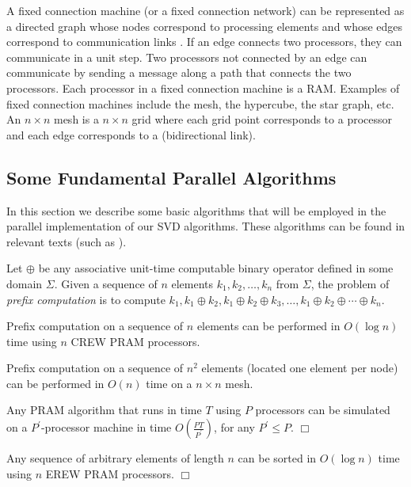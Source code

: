 A fixed connection machine (or a fixed connection network)
can be represented as a
directed graph whose nodes correspond
to processing elements and whose edges correspond to communication links \cite{Lei92,HSR08}.
If an edge connects two processors, they can  communicate in a unit
step. Two processors not connected by an edge can
communicate by sending a message along a path that connects
the two processors. Each processor in a fixed connection machine is
a RAM. 
Examples of fixed connection machines include the mesh, the
hypercube, the star graph, etc. An $n\times n$ mesh is a $n\times n$ grid where each grid point corresponds to
a processor and each edge corresponds to a (bidirectional link).

\subsection{Some Fundamental Parallel Algorithms}
In this section we  describe some basic algorithms that will be employed in
the parallel implementation of our SVD algorithms. These algorithms can be found in relevant texts 
(such as \cite{HSR08,Jaj92,Lei92}).

Let $\oplus$ be any associative unit-time computable
binary operator defined in some
domain $\Sigma$. Given a sequence of $n$ elements
$k_1,k_2,\ldots,k_n$ from $\Sigma$,
the problem of {\em prefix computation} is to compute
$k_1,k_1\oplus k_2,k_1\oplus k_2\oplus k_3,\ldots,k_1\oplus k_2\oplus\cdots \oplus k_n$.

\begin{lemma}
\label{prefix1}
Prefix computation on a sequence of $n$ elements can be performed in
$O(\log n)$ time using $n$ CREW PRAM processors.
\end{lemma}

\begin{lemma}
\label{prefix2}
Prefix computation on a sequence of $n^2$ elements (located one element per node) can be performed in
$O(n)$ time on a $n\times n$ mesh. 
\end{lemma}

\begin{lemma}
\label{slowdown}
{}
Any PRAM algorithm that runs in time $T$ using $P$ processors
can be simulated on a $P^\prime$-processor machine in time
$O\left (\frac{PT}{P^\prime}\right )$, for any $P^\prime\leq P$. \hfill $\Box$
\end{lemma}

\begin{lemma}
\label{sort1}
Any  sequence of arbitrary elements of length $n$ can be sorted in
$O(\log n)$ time using $n$ EREW PRAM processors.
\hfill $\Box$
\end{lemma}

